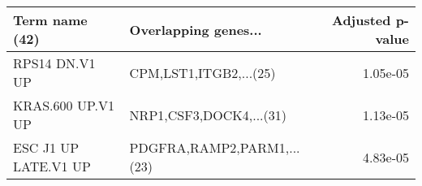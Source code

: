 \begin{tabular}{llr}
\toprule
      Term name (42) &       Overlapping genes... &  Adjusted p-value \\
\midrule
      RPS14 DN.V1 UP &     CPM,LST1,ITGB2,...(25) &          1.05e-05 \\
   KRAS.600 UP.V1 UP &    NRP1,CSF3,DOCK4,...(31) &          1.13e-05 \\
ESC J1 UP LATE.V1 UP & PDGFRA,RAMP2,PARM1,...(23) &          4.83e-05 \\
\bottomrule
\end{tabular}
